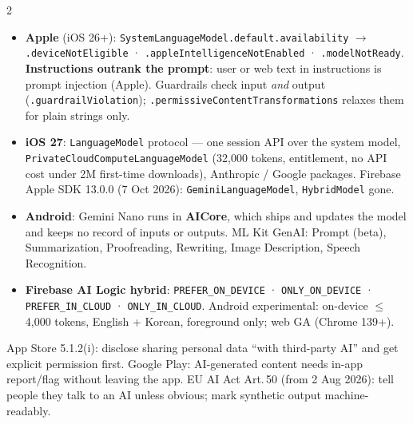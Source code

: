 \documentclass[8pt]{extarticle}
\newcommand\ct[1]{\texttt{#1}}
\newcommand\hd[1]{\par\vspace{3pt}\noindent{\bfseries\color{sheetBlue}#1}\par\vspace{1pt}}
\begin{document}
\begin{multicols}{2}
\hd{On device — the APIs}
\begin{itemize}
  \item \textbf{Apple} (iOS 26+): \ct{SystemLanguageModel.default.availability} $\to$
        \ct{.deviceNotEligible} · \ct{.appleIntelligenceNotEnabled} · \ct{.modelNotReady}.
        \textbf{Instructions outrank the prompt}: user or web text in instructions is prompt
        injection (Apple). Guardrails check input \emph{and} output (\ct{.guardrailViolation});
        \ct{.permissiveContentTransformations} relaxes them for plain strings only.
  \item \textbf{iOS 27}: \ct{LanguageModel} protocol — one session API over the system model,
        \ct{PrivateCloudComputeLanguageModel} (32,000 tokens, entitlement, no API cost under 2M
        first-time downloads), Anthropic / Google packages. Firebase Apple SDK 13.0.0 (7 Oct
        2026): \ct{GeminiLanguageModel}, \ct{HybridModel} gone.
  \item \textbf{Android}: Gemini Nano runs in \textbf{AICore}, which ships and updates the model and
        keeps no record of inputs or outputs. ML Kit GenAI: Prompt (beta), Summarization,
        Proofreading, Rewriting, Image Description, Speech Recognition.
  \item \textbf{Firebase AI Logic hybrid}: \ct{PREFER\_ON\_DEVICE} · \ct{ONLY\_ON\_DEVICE} ·
        \ct{PREFER\_IN\_CLOUD} · \ct{ONLY\_IN\_CLOUD}. Android experimental: on-device $\le$4,000
        tokens, English + Korean, foreground only; web GA (Chrome 139+).
\end{itemize}

\hd{Store and law}
App Store 5.1.2(i): disclose sharing personal data ``with third-party AI'' and get explicit
permission first. Google Play: AI-generated content needs in-app report/flag without leaving the
app. EU AI Act Art.\,50 (from 2 Aug 2026): tell people they talk to an AI unless obvious; mark
synthetic output machine-readably.

\columnbreak


\end{multicols}
\end{document}
